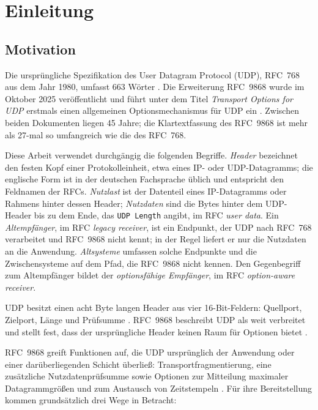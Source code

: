 
\chapter{Einleitung}
\label{chap:einleitung}

\section{Motivation}
\label{sec:motivation}

Die ursprüngliche Spezifikation des User Datagram Protocol (UDP), RFC~768 aus dem Jahr 1980, umfasst 663 Wörter
\cite{rfc768}. Die Erweiterung RFC~9868 wurde im Oktober 2025 veröffentlicht und führt unter dem Titel
\emph{Transport Options for UDP} erstmals einen allgemeinen Optionsmechanismus für UDP ein \cite{rfc9868}.
Zwischen beiden Dokumenten liegen 45 Jahre; die Klartextfassung des RFC~9868 ist mehr als 27-mal so umfangreich
wie die des RFC~768.

Diese Arbeit verwendet durchgängig die folgenden Begriffe. \emph{Header} bezeichnet den festen Kopf einer
Protokolleinheit, etwa eines IP- oder UDP-Datagramms; die englische Form ist in der deutschen Fachsprache
üblich und entspricht den Feldnamen der RFCs. \emph{Nutzlast} ist der Datenteil eines IP-Datagramms oder
Rahmens hinter dessen Header; \emph{Nutzdaten} sind die Bytes hinter dem UDP-Header bis zu dem Ende, das
\texttt{UDP Length} angibt, im RFC \textit{user data}. Ein \emph{Altempfänger}, im RFC \textit{legacy
receiver}, ist ein Endpunkt, der UDP nach RFC~768 verarbeitet und RFC~9868 nicht kennt; in der Regel liefert
er nur die Nutzdaten an die Anwendung. \emph{Altsysteme} umfassen solche Endpunkte und die Zwischensysteme
auf dem Pfad, die RFC~9868 nicht kennen. Den Gegenbegriff zum Altempfänger bildet der \emph{optionsfähige
Empfänger}, im RFC \textit{option-aware receiver}.

UDP besitzt einen acht Byte langen Header aus vier 16-Bit-Feldern: Quellport, Zielport, Länge und
Prüfsumme \cite{rfc768}. RFC~9868 beschreibt UDP als weit verbreitet und stellt fest, dass der
ursprüngliche Header keinen Raum für Optionen bietet \cite[Sec.~4]{rfc9868}.

RFC~9868 greift Funktionen auf, die UDP ursprünglich der Anwendung oder einer darüberliegenden Schicht überließ:
Transportfragmentierung, eine zusätzliche Nutzdatenprüfsumme sowie Optionen zur Mitteilung maximaler Datagrammgrößen
und zum Austausch von Zeitstempeln \cite[Sec.~11.3 bis 11.6 und 11.8]{rfc9868}. Für ihre Bereitstellung kommen
grundsätzlich drei Wege in Betracht:

